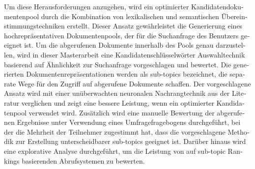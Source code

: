 \begin{otherlanguage}{ngerman}
Um diese Herausforderungen anzugehen, wird ein optimierter Kandidatendokumentenpool durch die Kombination von lexikalischen und semantischen Übereinstimmungstechniken erstellt. Dieser Ansatz gewährleistet die Generierung eines hochrepräsentativen Dokumentenpools, der für die Suchanfrage des Benutzers geeignet ist. Um die abgerufenen Dokumente innerhalb des Pools genau darzustellen, wird in dieser Masterarbeit eine Kandidatenschlüsselwörter Auswahltechnik basierend auf Ähnlichkeit zur Suchanfrage vorgeschlagen und bewertet. Die generierten Dokumentenrepräsentationen werden als sub-topics bezeichnet, die separate Wege für den Zugriff auf abgerufene Dokumente schaffen. Der vorgeschlagene Ansatz wird mit einer unüberwachten neuronalen Nachrangtechnik aus der Literatur verglichen und zeigt eine bessere Leistung, wenn ein optimierter Kandidatenpool verwendet wird. Zusätzlich wird eine manuelle Bewertung der abgerufenen Ergebnisse unter Verwendung eines Umfragefragebogens durchgeführt, bei der die Mehrheit der Teilnehmer zugestimmt hat, dass die vorgeschlagene Methodik zur Erstellung unterscheidbarer sub-topics geeignet ist. Darüber hinaus wird eine explorative Analyse durchgeführt, um die Leistung von auf sub-topic Rankings basierenden Abrufsystemen zu bewerten.\\
\\
\\
\\
\\
\\
\\
\\
\\
\\
\\
\\
\\
\\
\\
\\
\\
\\
\\


\end{otherlanguage}

